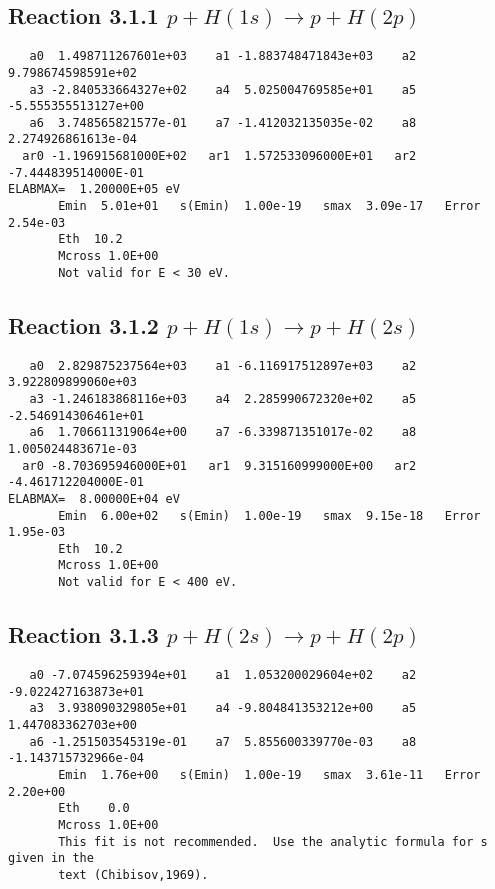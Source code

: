 \documentclass[12pt,dvipdfmx]{article}
\begin{document}
\newpage
\subsection{
Reaction 3.1.1 $   p + H(1s) \rightarrow p + H(2p)$}


\begin{small}\begin{verbatim}
   a0  1.498711267601e+03    a1 -1.883748471843e+03    a2  9.798674598591e+02
   a3 -2.840533664327e+02    a4  5.025004769585e+01    a5 -5.555355513127e+00
   a6  3.748565821577e-01    a7 -1.412032135035e-02    a8  2.274926861613e-04
  ar0 -1.196915681000E+02   ar1  1.572533096000E+01   ar2 -7.444839514000E-01
ELABMAX=  1.20000E+05 eV
       Emin  5.01e+01   s(Emin)  1.00e-19   smax  3.09e-17   Error  2.54e-03
       Eth  10.2
       Mcross 1.0E+00
       Not valid for E < 30 eV.
\end{verbatim}\end{small}


\newpage
\subsection{
Reaction 3.1.2 $   p + H(1s) \rightarrow p + H(2s)$}


\begin{small}\begin{verbatim}
   a0  2.829875237564e+03    a1 -6.116917512897e+03    a2  3.922809899060e+03
   a3 -1.246183868116e+03    a4  2.285990672320e+02    a5 -2.546914306461e+01
   a6  1.706611319064e+00    a7 -6.339871351017e-02    a8  1.005024483671e-03
  ar0 -8.703695946000E+01   ar1  9.315160999000E+00   ar2 -4.461712204000E-01
ELABMAX=  8.00000E+04 eV
       Emin  6.00e+02   s(Emin)  1.00e-19   smax  9.15e-18   Error  1.95e-03
       Eth  10.2
       Mcross 1.0E+00
       Not valid for E < 400 eV.
\end{verbatim}\end{small}

\newpage
\subsection{
Reaction 3.1.3 $   p + H(2s) \rightarrow p + H(2p)$}


\begin{small}\begin{verbatim}
   a0 -7.074596259394e+01    a1  1.053200029604e+02    a2 -9.022427163873e+01
   a3  3.938090329805e+01    a4 -9.804841353212e+00    a5  1.447083362703e+00
   a6 -1.251503545319e-01    a7  5.855600339770e-03    a8 -1.143715732966e-04
       Emin  1.76e+00   s(Emin)  1.00e-19   smax  3.61e-11   Error  2.20e+00
       Eth    0.0
       Mcross 1.0E+00
       This fit is not recommended.  Use the analytic formula for s given in the
       text (Chibisov,1969).
\end{verbatim}\end{small}
\end{document}
